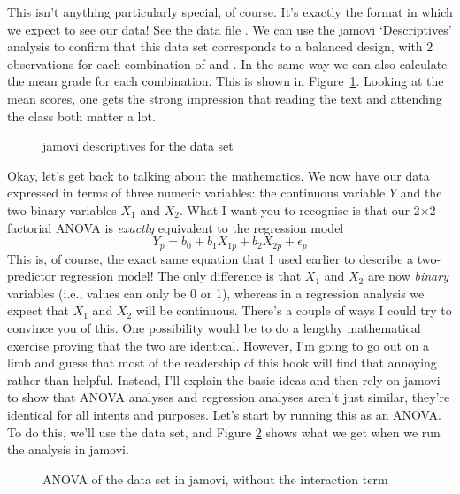 \noindent
This isn't anything particularly special, of course. It's exactly the format in which we expect to see our data! See the data file . We can use the jamovi `Descriptives' analysis to confirm that this data set corresponds to a balanced design, with 2 observations for each combination of  and . In the same way we can also calculate the mean grade for each combination. This is shown in Figure~\ref{fig:rtfmdescriptives}. Looking at the mean scores, one gets the strong impression that reading the text and attending the class both matter a lot.

\bigskip
\begin{figure}[!htb]
\begin{center}
\caption{jamovi descriptives for the  data set}
\label{fig:rtfmdescriptives}
\HR
\end{center}
\end{figure}


Okay, let's get back to talking about the mathematics. We now have our data expressed in terms of three numeric variables: the continuous variable $Y$ and the two binary variables $X_1$ and $X_2$. What I want you to recognise is that our 2$\times$2 factorial ANOVA is {\it exactly} equivalent to the regression model 
$$
Y_{p} = b_0 + b_1 X_{1p} + b_2 X_{2p} + \epsilon_p
$$
This is, of course, the exact same equation that I used earlier to describe a two-predictor regression model! The only difference is that $X_1$ and $X_2$ are now {\it binary} variables (i.e., values can only be 0 or 1), whereas in a regression analysis we expect that $X_1$ and $X_2$ will be continuous.  There's a couple of ways I could try to convince you of this. One possibility would be to do a lengthy mathematical exercise proving that the two are identical. However, I'm going to go out on a limb and guess that most of the readership of this book will find that annoying rather than helpful. Instead, I'll explain the basic ideas and then rely on jamovi to show that ANOVA analyses and regression analyses aren't just similar, they're identical for all intents and purposes. Let's start by running this as an ANOVA. To do this, we'll use the  data set, and Figure \ref{fig:factorialanova6} shows what we get when we run the analysis in jamovi.

\begin{figure}[!htb]
\begin{center}
\caption{ANOVA of the  data set in jamovi, without the interaction term}
\label{fig:factorialanova6}
\HR
\end{center}
\end{figure}

